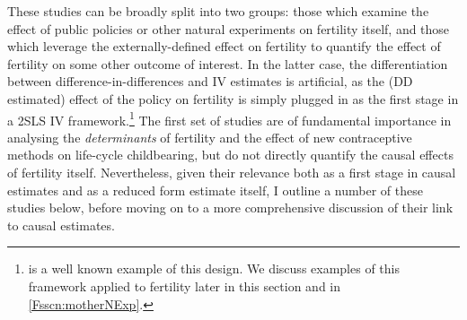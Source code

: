 \documentclass{article}
\begin{document}
\begin{spacing}{1.4}
These studies can be broadly split into two groups: those which examine the
effect of public policies or other natural experiments on fertility itself,
and those which leverage the externally-defined effect on fertility to quantify
the effect of fertility on some other outcome of interest. In the latter case, 
the differentiation between difference-in-differences and IV estimates is 
artificial, as the (DD estimated) effect of the policy on fertility is 
simply plugged in as the first stage in a 2SLS IV framework.\footnote{
\citet{Duflo2001} is a well known example of this design.  We discuss examples 
of this framework applied to fertility later in this section and in 
\ref{Fsscn:motherNExp}.} The first set of studies are of fundamental importance 
in analysing the \emph{determinants} of fertility and the effect of new 
contraceptive methods on life-cycle childbearing, but do not directly quantify 
the causal effects of fertility itself.  Nevertheless, given their relevance both 
as a first stage in causal estimates and as a reduced form estimate itself, I 
outline a number of these studies below, before moving on to a more comprehensive 
discussion of their link to causal estimates.


\end{spacing}
\end{document}
